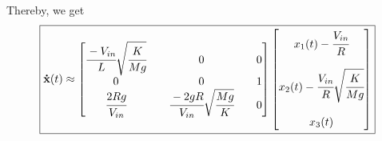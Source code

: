 Thereby, we get
\[
    \boxed{
        \mathbf{\dot x}(t) \approx
        \begin{bmatrix}
            \cfrac{-V_{in}}{L} \sqrt{\cfrac{K}{Mg}} &  & 0                                        &  & 0 \\
            0                                       &  & 0                                        &  & 1 \\
            \cfrac{2 R g}{V_{in}}                   &  & \cfrac{-2gR}{V_{in}}\sqrt{\cfrac{Mg}{K}} &  & 0
        \end{bmatrix}
        \begin{bmatrix}
            x_1(t) - \cfrac{V_{in}}{R}                      \\
            \\
            x_2(t) - \cfrac{V_{in}}{R} \sqrt{\cfrac{K}{Mg}} \\
            \\
            x_3(t)
        \end{bmatrix}
    }
\]
